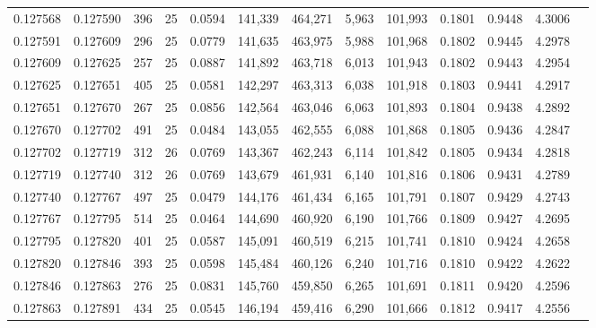 \begin{tabular}{rrrrrrrrrrrrr}
0.127568 & 0.127590 &   396 &  25 &                                     0.0594 & 141,339 & 464,271 &   5,963 & 101,993 & 0.1801 & 0.9448 & 4.3006 \\
0.127591 & 0.127609 &   296 &  25 &                                     0.0779 & 141,635 & 463,975 &   5,988 & 101,968 & 0.1802 & 0.9445 & 4.2978 \\
0.127609 & 0.127625 &   257 &  25 &                                     0.0887 & 141,892 & 463,718 &   6,013 & 101,943 & 0.1802 & 0.9443 & 4.2954 \\
0.127625 & 0.127651 &   405 &  25 &                                     0.0581 & 142,297 & 463,313 &   6,038 & 101,918 & 0.1803 & 0.9441 & 4.2917 \\
0.127651 & 0.127670 &   267 &  25 &                                     0.0856 & 142,564 & 463,046 &   6,063 & 101,893 & 0.1804 & 0.9438 & 4.2892 \\
0.127670 & 0.127702 &   491 &  25 &                                     0.0484 & 143,055 & 462,555 &   6,088 & 101,868 & 0.1805 & 0.9436 & 4.2847 \\
0.127702 & 0.127719 &   312 &  26 &                                     0.0769 & 143,367 & 462,243 &   6,114 & 101,842 & 0.1805 & 0.9434 & 4.2818 \\
0.127719 & 0.127740 &   312 &  26 &                                     0.0769 & 143,679 & 461,931 &   6,140 & 101,816 & 0.1806 & 0.9431 & 4.2789 \\
0.127740 & 0.127767 &   497 &  25 &                                     0.0479 & 144,176 & 461,434 &   6,165 & 101,791 & 0.1807 & 0.9429 & 4.2743 \\
0.127767 & 0.127795 &   514 &  25 &                                     0.0464 & 144,690 & 460,920 &   6,190 & 101,766 & 0.1809 & 0.9427 & 4.2695 \\
0.127795 & 0.127820 &   401 &  25 &                                     0.0587 & 145,091 & 460,519 &   6,215 & 101,741 & 0.1810 & 0.9424 & 4.2658 \\
0.127820 & 0.127846 &   393 &  25 &                                     0.0598 & 145,484 & 460,126 &   6,240 & 101,716 & 0.1810 & 0.9422 & 4.2622 \\
0.127846 & 0.127863 &   276 &  25 &                                     0.0831 & 145,760 & 459,850 &   6,265 & 101,691 & 0.1811 & 0.9420 & 4.2596 \\
0.127863 & 0.127891 &   434 &  25 &                                     0.0545 & 146,194 & 459,416 &   6,290 & 101,666 & 0.1812 & 0.9417 & 4.2556 \\

\end{tabular}
